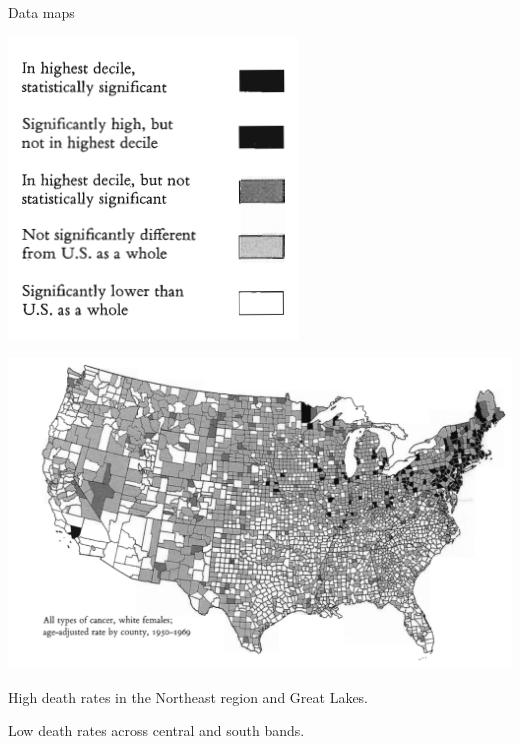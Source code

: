 \documentclass[
  ignorenonframetext,
]{beamer}
\begin{document}
\begin{frame}{Data maps}
\protect\hypertarget{data-maps-1}{}
\begin{minipage}{0.3\textwidth}
\centering
\includegraphics[width=\textwidth]{excellence_figs/fig_7.png}
\end{minipage}
\hfill
\begin{minipage}{0.6\textwidth}
\centering
\includegraphics[width=\textwidth]{excellence_figs/fig_6.png}
\end{minipage}

High death rates in the Northeast region and Great Lakes.

Low death rates across central and south bands.
\end{frame}
\end{document}
